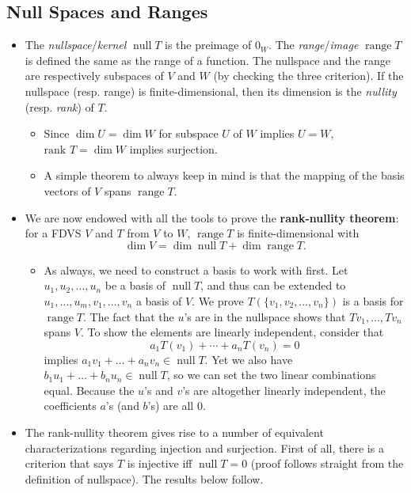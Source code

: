 \documentclass{article}
\newcommand{\n}{\operatorname{null}}
\renewcommand{\r}{\operatorname{range}}
\renewcommand{\d}{\dim}
\begin{document}
\subsection{Null Spaces and Ranges}
\begin{itemize}
    \item The \textit{nullspace}/\textit{kernel} $\n T$ is the preimage of $0_W$. The \textit{range}/\textit{image} $\r T$ is defined the same as the range of a function. The nullspace and the range are respectively subspaces of $V$ and $W$ (by checking the three criterion). If the nullspace (resp. range) is finite-dimensional, then its dimension is the \textit{nullity} (resp. \textit{rank}) of $T$.
    \begin{itemize}
        \item Since $\d U = \d W$ for subspace $U$ of $W$ implies $U = W$, $\text{rank }T = \d W$ implies surjection.
        \item A simple theorem to always keep in mind is that the mapping of the basis vectors of $V$ spans $\r T$.
    \end{itemize}
    \item We are now endowed with all the tools to prove the \textbf{rank-nullity theorem}: for a FDVS $V$ and $T$ from $V$ to $W$, $\r T$ is finite-dimensional with $$\d V = \d \n T + \d \r T.$$
    \begin{itemize}
        \item As always, we need to construct a basis to work with first. Let ${u_1, u_2, \dots, u_n}$ be a basis of $\n T$, and thus can be extended to ${u_1,\dots,u_m,v_1,\dots,v_n}$ a basis of $V$. We prove $T(\{v_1, v_2, \dots, v_n\})$ is a basis for $\r T$. The fact that the $u$'s are in the nullspace shows that $Tv_1, \dots,Tv_n$ spans $V$. To show the elements are linearly independent, consider that $$a_1 T(v_1)+\cdots+a_n T(v_n) = 0$$ implies $a_1v_1+\dots+a_nv_n \in \n T$. Yet we also have $b_1u_1+\dots+b_nu_n \in \n T$, so we can set the two linear combinations equal. Because the $u$'s and $v$'s are altogether linearly independent, the coefficients $a$'s (and $b$'s) are all 0.
    \end{itemize}
    \item The rank-nullity theorem gives rise to a number of equivalent characterizations regarding injection and surjection. First of all, there is a criterion that says $T$ is injective iff $\n T = {0}$ (proof follows straight from the definition of nullspace). The results below follow.
    \begin{itemize}

\end{itemize}
\end{itemize}
\end{document}
